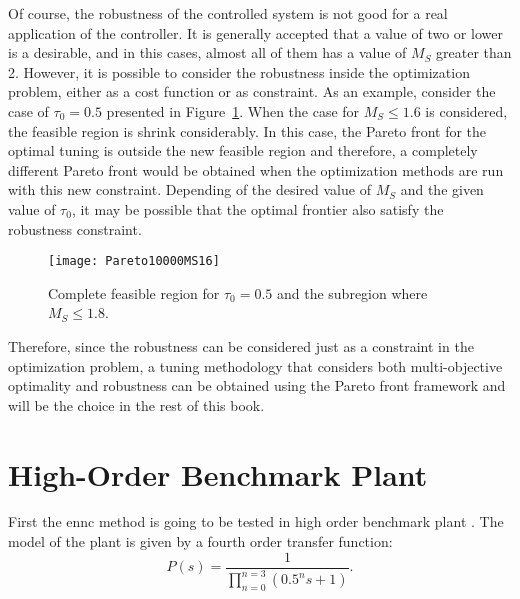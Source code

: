 Of course, the robustness of the controlled system is not good for a real application of the controller. It is generally accepted that a value of two or lower is a desirable, and in this cases, almost all of them has a value of $M_S$ greater than 2. However, it is possible to consider the robustness inside the optimization problem, either as a cost function or as constraint. As an example, consider the case of $\tau_0=0.5$ presented in Figure~\ref{fig:Pareto10000MS16}. When the case for $M_S\leq 1.6$ is considered, the feasible region is shrink considerably. In this case, the Pareto front for the optimal tuning is outside the new feasible region and therefore, a completely different Pareto front would be obtained when the optimization methods are run with this new constraint. Depending of the desired value of $M_S$ and the given value of $\tau_0$, it may be possible that the optimal frontier also satisfy the robustness constraint.
%
\begin{figure}%
\centering
\texttt{[image: Pareto10000MS16]}%
\caption{Complete feasible region for $\tau_0=0.5$ and the subregion where $M_S \leq 1.8$.}%
\label{fig:Pareto10000MS16}%
\end{figure}
%
Therefore, since the robustness can be considered just as a constraint in the optimization problem, a tuning methodology that considers both multi-objective optimality and robustness can be obtained using the Pareto front framework and will be the choice in the rest of this book.
%
%
\section{High-Order Benchmark Plant}
\label{sec:Bechmark}
First the \gls{ennc} method is going to be tested in high order benchmark plant \citep{Astroem2000}. The model of the plant is given by a fourth order transfer function:
\begin{equation}
P(s) = \frac{1}{\prod_{n=0}^{n=3}(0.5^n s+1)}.
\label{eq:benchmarkTF}
\end{equation}

